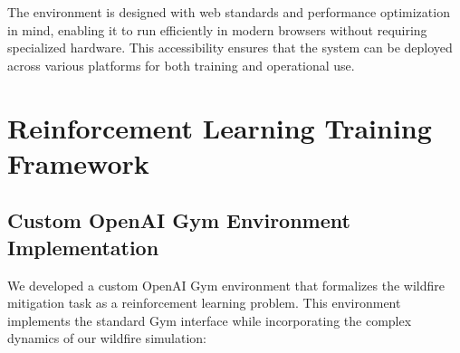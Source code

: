 \documentclass[conference]{IEEEtran}
\begin{document}
\noindent
The environment is designed with web standards and performance optimization in mind, enabling it to run efficiently in modern browsers without requiring specialized hardware. This accessibility ensures that the system can be deployed across various platforms for both training and operational use.

\section{Reinforcement Learning Training Framework}

\subsection{Custom OpenAI Gym Environment Implementation}

We developed a custom OpenAI Gym environment that formalizes the wildfire mitigation task as a reinforcement learning problem. This environment implements the standard Gym interface while incorporating the complex dynamics of our wildfire simulation:
\end{document}
